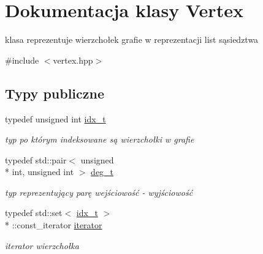 \hypertarget{classVertex}{\section{Dokumentacja klasy Vertex}
\label{classVertex}
}


klasa reprezentuje wierzchołek grafie w reprezentacji list sąsiedztwa  




{\ttfamily \#include $<$vertex.\-hpp$>$}

\subsection*{Typy publiczne}
\begin{DoxyCompactItemize}
\item 
typedef unsigned int \hyperlink{classVertex_a12fe2194264f72b70b284bba723052c1}{idx\-\_\-t}
\begin{DoxyCompactList}\small\item\em typ po którym indeksowane są wierzchołki w grafie \end{DoxyCompactList}\item 
typedef std\-::pair$<$ unsigned \\*
int, unsigned int $>$ \hyperlink{classVertex_a9dfe0aad480124fc2948013263615e2e}{deg\-\_\-t}
\begin{DoxyCompactList}\small\item\em typ reprezentujący parę wejściowość -\/ wyjściowość \end{DoxyCompactList}\item 
typedef std\-::set$<$ \hyperlink{classVertex_a12fe2194264f72b70b284bba723052c1}{idx\-\_\-t} $>$\\*
\-::const\-\_\-iterator \hyperlink{classVertex_ac889dee153c9abe7b3fb652ec6583df9}{iterator}
\begin{DoxyCompactList}\small\item\em iterator wierzchołka \end{DoxyCompactList}\end{DoxyCompactItemize}
